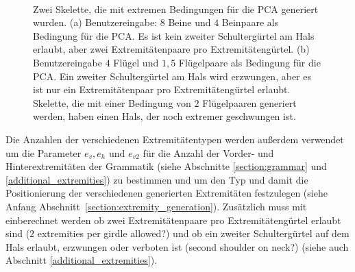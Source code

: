 \begin{figure}
 ~
 
 \caption{Zwei Skelette, die mit extremen Bedingungen für die PCA generiert wurden. (a) Benutzereingabe: $8$ Beine und $4$ Beinpaare als Bedingung für die PCA. Es ist kein zweiter Schultergürtel am Hals erlaubt, aber zwei Extremitätenpaare pro Extremitätengürtel. (b) Benutzereingabe $4$ Flügel und $1{,}5$ Flügelpaare als Bedingung für die PCA. Ein zweiter Schultergürtel am Hals wird erzwungen, aber es ist nur ein Extremitätenpaar pro Extremitätengürtel erlaubt. Skelette, die mit einer Bedingung von $2$ Flügelpaaren generiert werden, haben einen Hals, der noch extremer geschwungen ist.}
 \label{more_extremities}
\end{figure}


Die Anzahlen der verschiedenen Extremitätentypen werden außerdem verwendet um die Parameter $e_v, e_h$ und $e_{v2}$ für die Anzahl der Vorder- und Hinterextremitäten der Grammatik (siehe Abschnitte \ref{section:grammar} und \ref{additional_extremities}) zu bestimmen und um den Typ und damit die Positionierung der verschiedenen generierten Extremitäten festzulegen (siehe Anfang \mbox{Abschnitt \ref{section:extremity_generation}}). Zusätzlich muss mit einberechnet werden ob zwei Extremitätenpaare pro Extremitätengürtel erlaubt sind ($2$ extremities per girdle allowed?) und ob ein zweiter Schultergürtel auf dem Hals erlaubt, erzwungen oder verboten ist (second shoulder on neck?) (siehe auch Abschnitt \ref{additional_extremities}).

